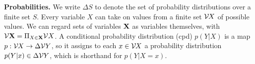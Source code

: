 \documentclass{article}
\begin{document}
    \textbf{Probabilities.}
We write $\Delta S$ to denote the set of probability distributions over a finite set $S$.
Every variable $X$ can take on values from a finite set $\mathcal V\mskip-1.5mu X$ of possible values.
We can regard sets of variables $\mathbf{X}$ as variables themselves, with
$\mathcal V \mathbf{X} = \Pi_{X \in \mathbf{X}} \mathcal V X$.
A conditional probability distribution (cpd) $p(Y|X)$ is a map
$p : \mathcal V\mskip-1.5mu  X \to \Delta \mathcal V Y$, so it assigns to each $x \in \mathcal V\mskip-1.5mu X$ a
probability distribution $p(Y|x) \in \Delta \mathcal V Y$, which is shorthand for $p(Y|X\!\!=\!x)$.
\end{document}
